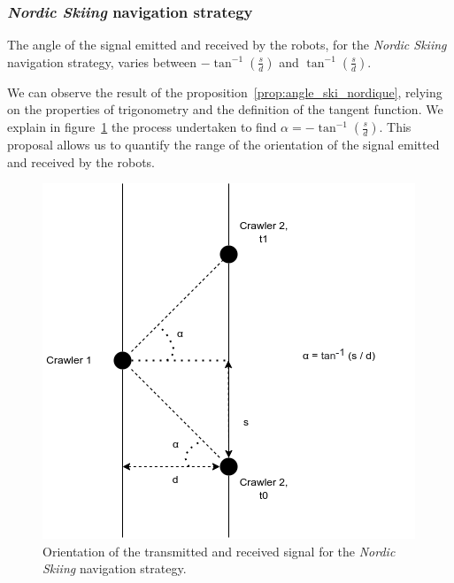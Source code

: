 \documentclass[english,RandD]{rapportPFE}  %
\begin{document}
			\subsubsection*{\textit{Nordic Skiing} navigation strategy}
				\begin{Proposition}
					The angle of the signal emitted and received by the robots, for the \textit{Nordic Skiing} navigation strategy, varies between $-\tan^{-1}(\frac{s}{d})$ and $\tan ^{-1}(\frac{s}{d})$.
					\label{prop:angle_ski_nordique}
				\end{Proposition}

				We can observe the result of the proposition~\ref{prop:angle_ski_nordique}, relying on the properties of trigonometry and the definition of the tangent function.
				We explain in figure~\ref{fig:angle_ski_nordique} the process undertaken to find $\alpha = -\tan^{-1}(\frac{s}{d})$.
				This proposal allows us to quantify the range of the orientation of the signal emitted and received by the robots.

				\begin{figure}[h!]
					\centering
					\includegraphics[scale=0.5]{graphics/angle_ski_nordique.png}
					\caption{Orientation of the transmitted and received signal for the \textit{Nordic Skiing} navigation strategy.}
					\label{fig:angle_ski_nordique}
				\end{figure}
\end{document}
